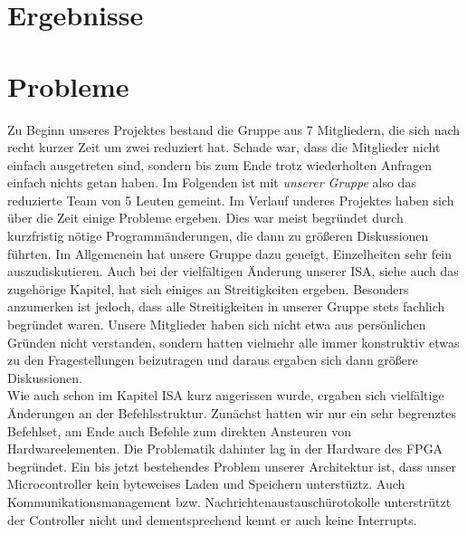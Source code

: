 
\section{Ergebnisse}

\section{Probleme} %
Zu Beginn unseres Projektes bestand die Gruppe aus 7 Mitgliedern, die sich nach recht kurzer Zeit um zwei reduziert hat. Schade war, dass die Mitglieder nicht einfach ausgetreten sind, sondern bis zum Ende trotz wiederholten Anfragen einfach nichts getan haben. Im Folgenden ist mit \textit{unserer Gruppe} also das reduzierte Team von 5 Leuten gemeint.
Im Verlauf underes Projektes haben sich über die Zeit einige Probleme ergeben. Dies war meist begründet durch kurzfristig nötige Programmänderungen, die dann zu größeren Diskussionen führten. Im Allgemenein hat unsere Gruppe dazu geneigt, Einzelheiten sehr fein auszudiskutieren. Auch bei der vielfältigen Änderung unserer ISA, siehe auch das zugehörige Kapitel, hat sich einiges an Streitigkeiten ergeben. Besonders anzumerken ist jedoch, dass alle Streitigkeiten in unserer Gruppe stets fachlich begründet waren. Unsere Mitglieder haben sich nicht etwa aus persönlichen Gründen nicht verstanden, sondern hatten vielmehr alle immer konstruktiv etwas zu den Fragestellungen beizutragen und daraus ergaben sich dann größere Diskussionen.\\[1em]
%
Wie auch schon im Kapitel ISA kurz angerissen wurde, ergaben sich vielfältige Änderungen an der Befehlsstruktur. Zunächst hatten wir nur ein sehr begrenztes Befehlset, am Ende auch Befehle zum direkten Ansteuren von Hardwareelementen. Die Problematik dahinter lag in der Hardware des FPGA begründet. 
Ein bis jetzt bestehendes Problem unserer Architektur ist, dass unser Microcontroller kein byteweises Laden und Speichern unterstüztz. Auch Kommunikationsmanagement bzw. Nachrichtenaustauschürotokolle unterstrützt der Controller nicht und dementsprechend kennt er auch keine Interrupts.

